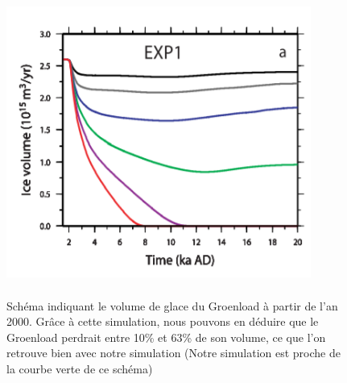 \documentclass{article}
\begin{document}
\begin{figure}[!htpb]
\centering
\includegraphics[width=10cm, keepaspectratio=true, height=10cm]{Variation.png}
\caption{Schéma indiquant le volume de glace du Groenload à partir de l'an 2000. Grâce à cette simulation, nous pouvons en déduire que le Groenload perdrait entre 10\% et 63\% de son volume, ce que l'on retrouve bien avec notre simulation (Notre simulation est proche de la courbe verte de ce schéma) }
\end{figure}
\newpage



\end{document}
